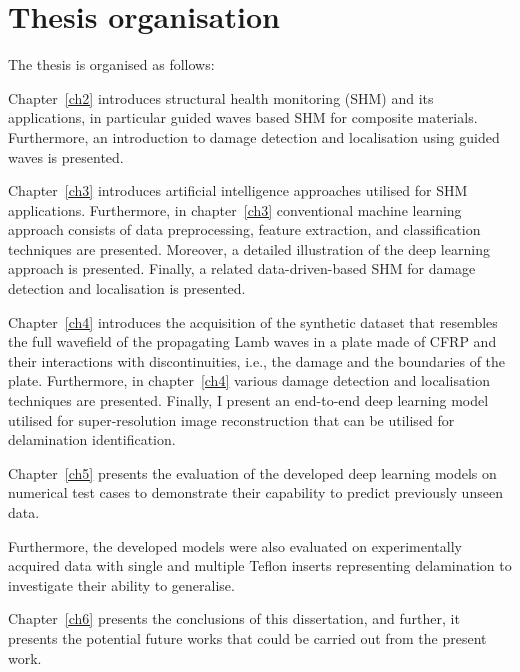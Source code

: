 \section{Thesis organisation}
\label{sec15}
The thesis is organised as follows:

Chapter~\ref{ch2} introduces structural health monitoring (SHM) and its applications, in particular guided waves based SHM for composite materials.
Furthermore, an introdu\-ction to damage detection and localisation using guided waves is presented.

Chapter~\ref{ch3} introduces artificial intelligence approaches utilised for SHM applications.
Furthermore, in chapter~\ref{ch3}  conventional machine learning approach consists of data preprocessing, feature extraction, and classification techniques are presented.
Moreover, a detailed illustration of the deep learning approach is presented.
Finally, a related data-driven-based SHM for damage detection and localisation is presented.

Chapter~\ref{ch4} introduces the acquisition of the synthetic dataset that resembles the full wavefield of the propagating Lamb waves in a plate made of CFRP and their interactions with discontinuities, i.e., the damage and the boundaries of the plate.
Furthermore, in chapter~\ref{ch4} various damage detection and localisation techniques are presented.
Finally, I present an end-to-end deep learning model utilised for super-resolution image reconstruc\-tion that can be utilised for delamination identification.

Chapter~\ref{ch5} presents the evaluation of the developed deep learning models on numerical test cases to demonstrate their capability to predict previously unseen data.

Furthermore, the developed models were also evaluated on experimentally acquired data with single and multiple Teflon inserts representing delamination to investigate their ability to generalise.

Chapter~\ref{ch6} presents the conclusions of this dissertation, and further, it presents the potential future works that could be carried out from the present work.
